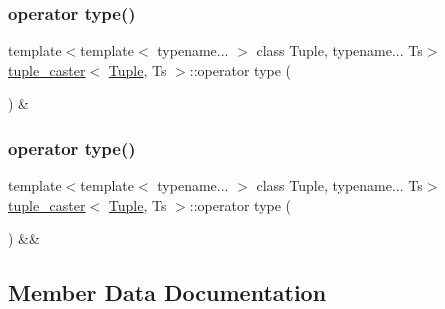 \mbox{\label{classtuple__caster_aafca74b6a6c2bf8297677534a7ac0a31}} 
\subsubsection{\texorpdfstring{operator type()}{operator type()}\hspace{0.1cm}{\footnotesize\ttfamily [1/2]}}
{\footnotesize\ttfamily template$<$template$<$ typename... $>$ class Tuple, typename... Ts$>$ \\
\mbox{\hyperlink{classtuple__caster}{tuple\+\_\+caster}}$<$ \mbox{\hyperlink{_python-ast_8h_a3f332c0be139cb870e516bad9b6a9366}{Tuple}}, Ts $>$\+::operator type (\begin{DoxyParamCaption}{ }\end{DoxyParamCaption}) \&\hspace{0.3cm}{\ttfamily [inline]}}

\mbox{\label{classtuple__caster_abdef03c6f4286e4b0b36bc6779d33f83}} 
\subsubsection{\texorpdfstring{operator type()}{operator type()}\hspace{0.1cm}{\footnotesize\ttfamily [2/2]}}
{\footnotesize\ttfamily template$<$template$<$ typename... $>$ class Tuple, typename... Ts$>$ \\
\mbox{\hyperlink{classtuple__caster}{tuple\+\_\+caster}}$<$ \mbox{\hyperlink{_python-ast_8h_a3f332c0be139cb870e516bad9b6a9366}{Tuple}}, Ts $>$\+::operator type (\begin{DoxyParamCaption}{ }\end{DoxyParamCaption}) \&\&\hspace{0.3cm}{\ttfamily [inline]}}



\subsection{Member Data Documentation}
\mbox{\label{classtuple__caster_ac5732f181ed863ea77052affd48e33a0}} 
